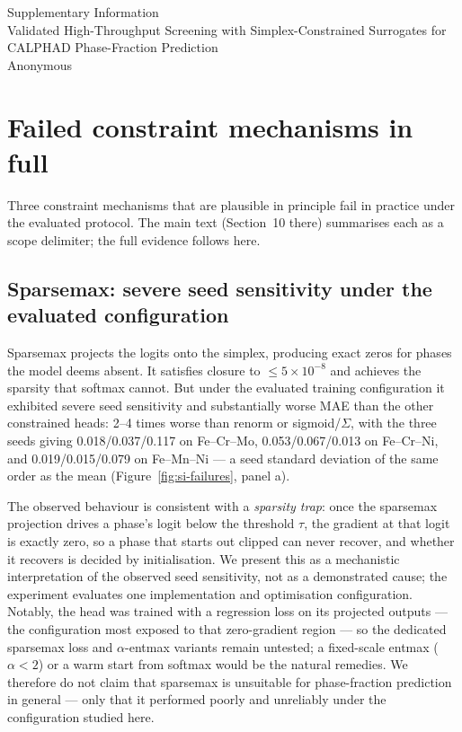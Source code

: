\documentclass[11pt,a4paper]{article}
\begin{document}
\begin{center}
{\Large Supplementary Information} \\[1ex]
{\large Validated High-Throughput Screening with Simplex-Constrained
Surrogates for CALPHAD Phase-Fraction Prediction} \\[1ex]
Anonymous
\end{center}

\section{Failed constraint mechanisms in full}
\label{sec:si-negative}

Three constraint mechanisms that are plausible in principle fail in
practice under the evaluated protocol. The main text
(Section~10 there) summarises each as a scope delimiter; the full
evidence follows here.

\subsection{Sparsemax: severe seed sensitivity under the evaluated
configuration}

Sparsemax \citep{martins2016sparsemax} projects the logits onto the simplex,
producing exact zeros for phases the model deems absent. It satisfies closure
to $\le 5\times10^{-8}$ and achieves the sparsity that softmax cannot. But
under the evaluated training configuration it exhibited severe seed
sensitivity and substantially worse MAE than the other constrained heads:
2--4 times worse than renorm or sigmoid/$\Sigma$, with the three seeds
giving 0.018/0.037/0.117 on Fe--Cr--Mo, 0.053/0.067/0.013 on Fe--Cr--Ni,
and 0.019/0.015/0.079 on Fe--Mn--Ni --- a seed standard deviation of the
same order as the mean (Figure~\ref{fig:si-failures}, panel a).

The observed behaviour is consistent with a \emph{sparsity trap}: once the
sparsemax projection drives a phase's logit below the threshold $\tau$,
the gradient at that logit is exactly zero, so a phase that starts out
clipped can never recover, and whether it recovers is decided by
initialisation. We present this as a mechanistic interpretation of the
observed seed sensitivity, not as a demonstrated cause; the experiment
evaluates one implementation and optimisation configuration. Notably, the
head was trained with a regression loss on its projected outputs --- the
configuration most exposed to that zero-gradient region --- so the
dedicated sparsemax loss and $\alpha$-entmax variants remain untested; a
fixed-scale entmax ($\alpha < 2$) or a warm start from softmax would be the
natural remedies. We therefore do not claim that sparsemax is
unsuitable for phase-fraction prediction in general --- only that it
performed poorly and unreliably under the configuration studied here.
\end{document}
